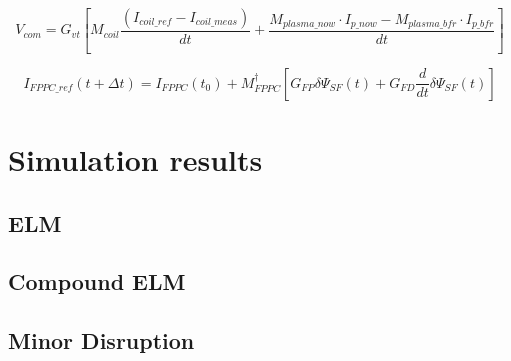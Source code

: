 \begin{equation}
V_{com}=G_{vt}\left[M_{coil}\frac{(I_{coil\_ref}-I_{coil\_meas})}{dt}+ \frac{M_{plasma\_now} \cdot I_{p\_now} - M_{plasma\_ bfr} \cdot I_{p\_bfr}}{dt}\right]
\end{equation}

\begin{equation}
I_{FPPC\_ref}(t+\Delta t)=I_{FPPC}(t_0)+ M^\dagger_{FPPC}\left[G_{FP}\delta \Psi_{SF}(t) + G_{FD}\frac{d}{dt}\delta\Psi_{SF}(t) \right]
\end{equation}
\section{Simulation results}	

\subsection{ELM}
\subsection{Compound ELM}
\subsection{Minor Disruption}